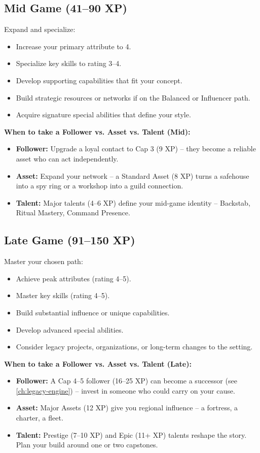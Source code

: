 \subsection*{Mid Game (41--90 XP)}
\label{sec:xp-mid-game}

Expand and specialize:
\begin{itemize}
\item Increase your primary attribute to 4.
\item Specialize key skills to rating 3--4.
\item Develop supporting capabilities that fit your concept.
\item Build strategic resources or networks if on the Balanced or Influencer path.
\item Acquire signature special abilities that define your style.
\end{itemize}

\noindent\textbf{When to take a Follower vs. Asset vs. Talent (Mid):}
\begin{itemize}
  \item \textbf{Follower:} Upgrade a loyal contact to Cap 3 (9 XP) -- they become a reliable asset who can act independently.
  \item \textbf{Asset:} Expand your network -- a Standard Asset (8 XP) turns a safehouse into a spy ring or a workshop into a guild connection.
  \item \textbf{Talent:} Major talents (4--6 XP) define your mid-game identity -- Backstab, Ritual Mastery, Command Presence.
\end{itemize}

\subsection*{Late Game (91--150 XP)}
\label{sec:xp-late-game}

Master your chosen path:
\begin{itemize}
\item Achieve peak attributes (rating 4--5).
\item Master key skills (rating 4--5).
\item Build substantial influence or unique capabilities.
\item Develop advanced special abilities.
\item Consider legacy projects, organizations, or long-term changes to the setting.
\end{itemize}

\noindent\textbf{When to take a Follower vs. Asset vs. Talent (Late):}
\begin{itemize}
  \item \textbf{Follower:} A Cap 4--5 follower (16--25 XP) can become a successor (see \ref{ch:legacy-engine}) -- invest in someone who could carry on your cause.
  \item \textbf{Asset:} Major Assets (12 XP) give you regional influence -- a fortress, a charter, a fleet.
  \item \textbf{Talent:} Prestige (7--10 XP) and Epic (11+ XP) talents reshape the story. Plan your build around one or two capstones.
\end{itemize}


